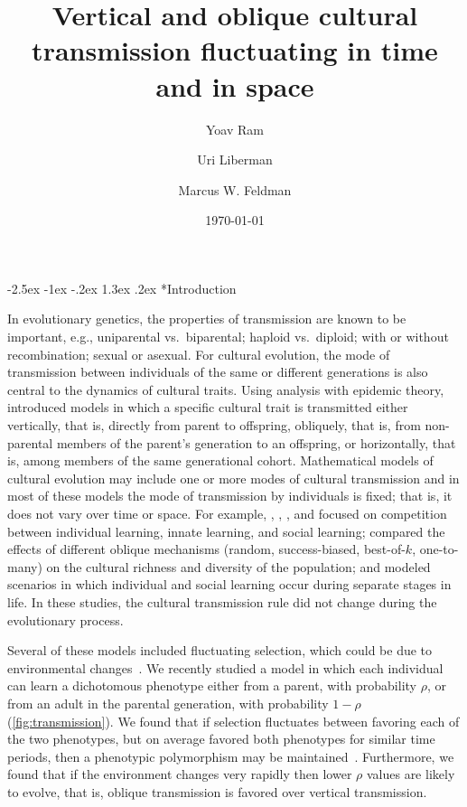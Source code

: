 \documentclass[14pt]{extarticle}
\title{Vertical and oblique cultural transmission fluctuating in time and in space}
\author[a]{Yoav Ram}
\author[b]{Uri Liberman}
\author[a]{Marcus W. Feldman}
\affil[a]{Department of Biology, Stanford University, Stanford, CA}
\affil[b]{School of Mathematical Sciences, Tel Aviv University, Israel}
\date{\today}
\makeatletter
\renewcommand\section{\@startsection {section}{1}{\z@}%
     {-2.5ex \@plus -1ex \@minus -.2ex}%
     {1.3ex \@plus.2ex}%
    {\Large\bfseries}}
\makeatother
\begin{document}
\maketitle


\section*{Introduction}

In evolutionary genetics, the properties of transmission are known to be important, e.g., uniparental vs.\ biparental; haploid vs.\ diploid; with or without recombination; sexual or asexual. For cultural evolution, the mode of transmission between individuals of the same or different generations is also central to the dynamics of cultural traits.
Using analysis with epidemic theory, \citet[ch.~3]{Cavalli-Sforza1981}  introduced models in which a specific cultural trait is transmitted either vertically, that is, directly from parent to offspring, obliquely, that is, from non-parental members of the parent's generation to an offspring, or horizontally, that is, among members of the same generational cohort.
Mathematical models of cultural evolution may include one or more modes of cultural transmission and in most of these models the mode of transmission by individuals is fixed; that is, it does not vary over time or space.
For example, \cite{Feldman1996}, \cite{Wakano2004}, \cite{Aoki2005}, and \citet{McElreath2008} focused on competition between individual learning, innate learning, and social learning; \citet{Fogarty2017} compared the effects of different oblique mechanisms (random, success-biased, best-of-$k$, one-to-many) on the cultural richness and diversity of the population; and \citet{Aoki2012} modeled scenarios in which individual and social learning occur during separate stages in life.
In these studies, the cultural transmission rule did not change during the evolutionary process.

Several of these models included fluctuating selection, which could be due to environmental changes~\citep[reviewed in][]{Aoki2014}. 
We recently studied a model in which each individual can learn a dichotomous phenotype either from a parent, with probability $\rho$, or from an adult in the parental generation, with probability $1-\rho$ (\autoref{fig:transmission}).
We found that if selection fluctuates between favoring each of the two phenotypes, but on average favored both phenotypes for similar time periods, then a phenotypic polymorphism may be maintained~\citep{Ram2018}.
Furthermore, we found that if the environment changes very rapidly then lower $\rho$ values are likely to evolve, that is, oblique transmission is favored over vertical transmission.
\end{document}
